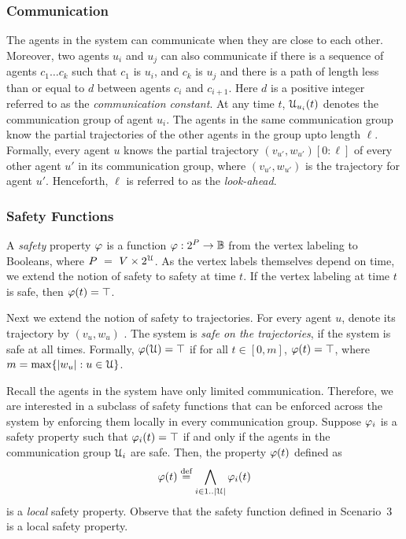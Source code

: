 \subsubsection*{Communication}
The agents in the system can communicate when they are close to each other. Moreover, two agents $u_i$ and $u_j$ can also communicate if there is a sequence of agents $c_1\dots c_k$ such that $c_1$ is $u_i$, and $c_k$ is $u_j$ and there is a path of length less than or equal to $d$ between agents $c_{i}$ and $c_{i+1}$. Here $d$ is a positive integer referred to as the \emph{communication constant}. 
At any time $t$, $\mathcal{U}_{u_i}(t)$ denotes the communication group of agent $u_i$. The agents in the same communication group know the partial trajectories of the other agents in the group upto length $\ell$. Formally, every agent $u$ knows the partial trajectory $(v_{u'},w_{u'})[0:\ell]$ of every other agent $u'$ in its communication group, where $(v_{u'},w_{u'})$ is the trajectory for agent $u'$. Henceforth, $\ell$ is referred to as the \emph{look-ahead}.

\subsubsection*{Safety Functions}
A \emph{safety} property $\varphi$ is a function $\varphi: 2^P \to \mathbb{B}$ from the vertex labeling to Booleans, where $P~=~V \times 2^{\mathcal{U}}$.
As the vertex labels themselves depend on time, we extend the notion of safety to safety at time $t$. If the vertex labeling at time $t$ is safe, then $\varphi(t) = \top$.

Next we extend the notion of safety to trajectories. For every agent $u$, denote its trajectory by $(v_u,w_u)$ . The system is \emph{safe on the trajectories}, if the system is safe at all times. Formally, $\varphi(\mathcal{U}) = \top$ if for all $t \in [0,m]$, $\varphi(t) = \top$, where $m = \max \{|w_u|:u \in \mathcal{U} \}$.

Recall the agents in the system have only limited communication. Therefore, we are interested in a subclass of safety functions that can be enforced across the system by enforcing them locally in every communication group. 
Suppose $\varphi_i$ is a safety property such that $\varphi_i(t) = \top$ if and only if the agents in the communication group $\mathcal{U}_i$ are safe.
Then, the property $\varphi(t)$ defined as 
\begin{equation} 
\varphi(t) \stackrel{\text{def}}{=} \bigwedge_{i \in 1..|\mathcal{U}|} \varphi_i(t) 
\end{equation} 
\noindent is a \emph{local} safety property.
Observe that the safety function defined in Scenario~3 is a local safety property.

